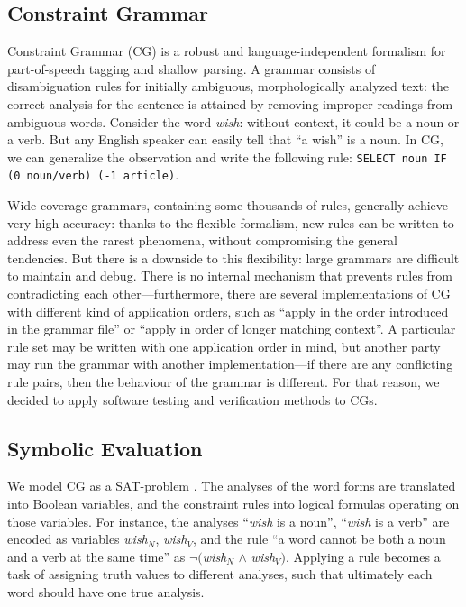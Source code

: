 \documentclass[conference]{IEEEtran}
\begin{document}
\subsection{Constraint Grammar}
Constraint Grammar (CG) \cite{karlsson1995constraint} is a robust and language-independent formalism 
for part-of-speech tagging and shallow parsing. 
A grammar consists of disambiguation rules for initially ambiguous, 
morphologically analyzed text: the correct analysis for the sentence 
is attained by removing improper readings from ambiguous words.
Consider the word \emph{wish}: without context, it could be a noun or a verb.
But any English speaker can easily tell that ``a wish'' is a noun.
In CG, we can generalize the observation and write the following rule: 
\texttt{SELECT noun IF (0 noun/verb) (-1 article)}.

Wide-coverage grammars, containing some thousands of rules, 
generally achieve very high accuracy: 
thanks to the flexible formalism, new rules can be written 
to address even the rarest phenomena, without compromising the general tendencies.
But there is a downside to this flexibility: large grammars are difficult to maintain
and debug. There is no internal mechanism that prevents rules from contradicting 
each other---furthermore, there are several implementations of CG with different kind of application orders,
such as ``apply in the order introduced in the grammar file'' or ``apply in order of longer matching context''.
A particular rule set may be written with one application order in mind, but another party may 
run the grammar with another implementation---if there are any conflicting rule pairs, then the behaviour of the grammar is different.
For that reason, we decided to apply software testing and verification methods to CGs.


\subsection{Symbolic Evaluation}

We model CG as a SAT-problem \cite{listenmaa_claessen2015}.
The analyses of the word forms are translated into Boolean variables, 
and the constraint rules into logical formulas operating on those variables.
For instance, the analyses ``\emph{wish} is a noun'', ``\emph{wish} is a verb'' 
are encoded as variables \emph{wish}$_{N}$, \emph{wish}$_{V}$,  
and the rule ``a word cannot be both a noun and a verb at the same time'' as 
$\neg($\emph{wish}$_{N}$ $\land$  \emph{wish}$_{V})$.
Applying a rule becomes a task of assigning truth values to different analyses,
such that ultimately each word should have one true analysis.
\end{document}
